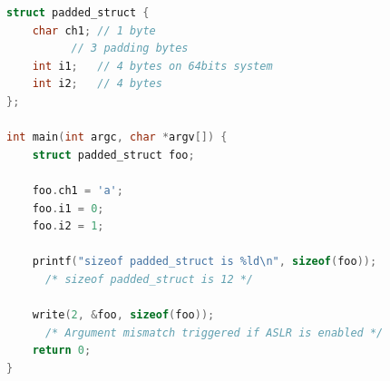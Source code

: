 \documentclass[english]{enstaPRE}
\begin{document}
\afficheGlossaire

\afficheIndex

\listedestables

\listedesfigures








\begin{lstlisting}[frame=single, caption=Writing a padded structure, label=lst:padstruct, language=C]
struct padded_struct {
    char ch1; // 1 byte
	      // 3 padding bytes
    int i1;   // 4 bytes on 64bits system
    int i2;   // 4 bytes
};

int main(int argc, char *argv[]) {
    struct padded_struct foo;
    
    foo.ch1 = 'a';
    foo.i1 = 0;
    foo.i2 = 1;
    
    printf("sizeof padded_struct is %ld\n", sizeof(foo)); 
      /* sizeof padded_struct is 12 */
    
    write(2, &foo, sizeof(foo));
      /* Argument mismatch triggered if ASLR is enabled */
    return 0;
}
\end{lstlisting}\label{padded}
\end{document}
